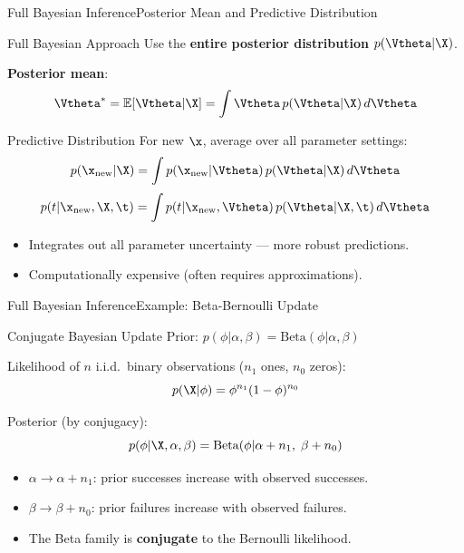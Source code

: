 \begin{frame}{Full Bayesian Inference}{Posterior Mean and Predictive Distribution}
  \begin{block}{Full Bayesian Approach}
    Use the \textbf{entire posterior distribution} $p(\Vtheta|\X)$.

    \textbf{Posterior mean}:
    \[
      \Vtheta^* = \mathbb{E}[\Vtheta|\X] = \int \Vtheta\, p(\Vtheta|\X)\,d\Vtheta
    \]
  \end{block}

  \begin{block}{Predictive Distribution}
    For new $\x$, average over all parameter settings:
    \[
      p(\x_\text{new}|\X) = \int p(\x_\text{new}|\Vtheta)\,p(\Vtheta|\X)\,d\Vtheta
    \]
    \[
      p(t|\x_\text{new},\X,\t) = \int p(t|\x_\text{new},\Vtheta)\,p(\Vtheta|\X,\t)\,d\Vtheta
    \]
  \end{block}

  \begin{itemize}
    \item Integrates out all parameter uncertainty — more robust predictions.
    \item Computationally expensive (often requires approximations).
  \end{itemize}
\end{frame}

\begin{frame}{Full Bayesian Inference}{Example: Beta-Bernoulli Update}
  \begin{exampleblock}{Conjugate Bayesian Update}
    Prior: $p(\phi|\alpha,\beta) = \mathrm{Beta}(\phi|\alpha,\beta)$

    Likelihood of $n$ i.i.d.\ binary observations ($n_1$ ones, $n_0$ zeros):
    \[
      p(\X|\phi) = \phi^{n_1}(1-\phi)^{n_0}
    \]

    Posterior (by conjugacy):
    \[
      p(\phi|\X,\alpha,\beta) = \mathrm{Beta}(\phi|\alpha+n_1,\;\beta+n_0)
    \]

    \begin{itemize}
      \item $\alpha \to \alpha + n_1$: prior successes increase with observed successes.
      \item $\beta \to \beta + n_0$: prior failures increase with observed failures.
      \item The Beta family is \textbf{conjugate} to the Bernoulli likelihood.
    \end{itemize}
  \end{exampleblock}
\end{frame}

